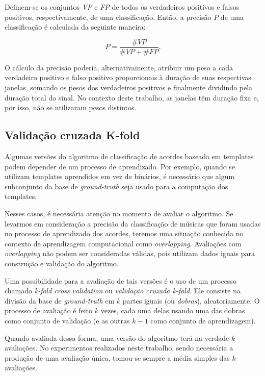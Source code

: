         Definem-se os conjuntos \textit{VP} e \textit{FP} de todos os verdadeiros positivos e falsos positivos, respectivamente, de uma classificação. Então, a precisão $P$ de uma classificação é calculada da seguinte maneira:
        
        \[
            P = \frac{\#VP}{\#VP + \#FP}.
        \]
        
        O cálculo da precisão poderia, alternativamente, atribuir um peso a cada verdadeiro positivo e falso positivo proporcionais à duração de suas respectivas janelas, somando os pesos dos verdadeiros positivos e finalmente dividindo pela duração total do sinal. No contexto deste trabalho, as janelas têm duração fixa e, por isso, não se utilizaram pesos distintos.
    
    \subsection{Validação cruzada K-fold}
        Algumas versões do algoritmo de classificação de acordes baseada em templates podem depender de um processo de aprendizado. Por exemplo, quando se utilizam templates aprendidos em vez de binários, é necessário que algum subconjunto da base de \textit{ground-truth} seja usado para a computação dos templates.
        
        Nesses casos, é necessária atenção no momento de avaliar o algoritmo. Se levarmos em consideração a precisão da classificação de músicas que foram usadas no processo de aprendizado dos acordes, teremos uma situação conhecida no contexto de aprendizagem computacional como \textit{overlapping}. Avaliações com \textit{overlapping} não podem ser consideradas válidas, pois utilizam dados iguais para construção e validação do algoritmo.
        
        Uma possibilidade para a avaliação de tais versões é o uso de um processo chamado \textit{k-fold cross validation} ou \textit{validação cruzada k-fold}. Ele consiste na divisão da base de \textit{ground-truth} em $k$ partes iguais (ou \textit{dobras}), aleatoriamente. O processo de avaliação é feito $k$ vezes, cada uma delas usando uma das dobras como conjunto de validação (e as outras $k - 1$ como conjunto de aprendizagem).
        
        Quando avaliada dessa forma, uma versão do algoritmo terá na verdade $k$ avaliações. No experimentos realizados neste trabalho, sendo necessária a produção de uma avaliação única, tomou-se sempre a média simples das $k$ avaliações.


